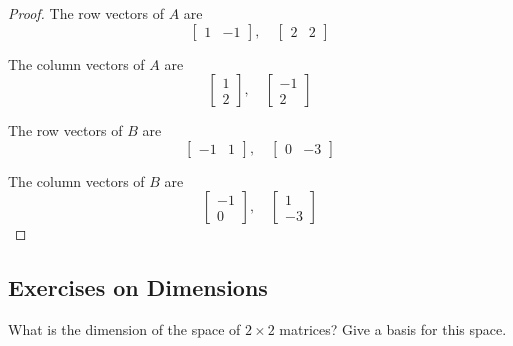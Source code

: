 \begin{proof}
    The row vectors of $A$ are
    \[
        \begin{bmatrix}
            1 & -1
        \end{bmatrix},\quad
        \begin{bmatrix}
            2 & 2
        \end{bmatrix}
    \]

    The column vectors of $A$ are
    \[
        \begin{bmatrix}
            1 \\
            2
        \end{bmatrix},\quad
        \begin{bmatrix}
            -1 \\
            2
        \end{bmatrix}
    \]

    The row vectors of $B$ are
    \[
        \begin{bmatrix}
            -1 & 1
        \end{bmatrix},\quad
        \begin{bmatrix}
            0 & -3
        \end{bmatrix}
    \]

    The column vectors of $B$ are
    \[
        \begin{bmatrix}
            -1 \\
            0
        \end{bmatrix},\quad
        \begin{bmatrix}
            1 \\
            -3
        \end{bmatrix}
    \]
\end{proof}

\subsection{Exercises on Dimensions}

\setcounter{exercise}{0}

\begin{exercise}
    What is the dimension of the space of $2\times 2$ matrices? Give a basis for this space.
\end{exercise}


